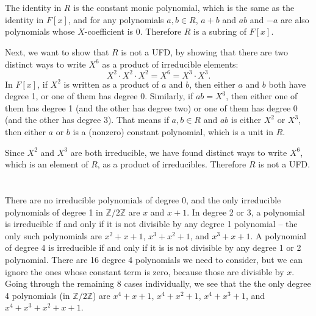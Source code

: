 \documentclass[12pt]{article}
\begin{document}
\section{}
\noindent{}\bigskip\par
The identity in $R$ is the constant monic polynomial, which is the same as the identity in $F[x]$, and for any polynomials $a,b \in R$, $a+b$ and $ab$ and $-a$ are also polynomials whose $X$-coefficient is 0. Therefore $R$ is a subring of $F[x]$.
\par
Next, we want to show that $R$ is not a UFD, by showing that there are two distinct ways to write $X^6$ as a product of irreducible elements:
\[ X^2 \cdot X^2 \cdot X^2 = X^6 = X^3 \cdot X^3. \]
In $F[x]$, if $X^2$ is written as a product of $a$ and $b$, then either $a$ and $b$ both have degree 1, or one of them has degree 0. Similarly, if $ab=X^3$, then either one of them has degree 1 (and the other has degree two) or one of them has degree 0 (and the other has degree 3). That means if $a,b \in R$ and $ab$ is either $X^2$ or $X^3$, then either $a$ or $b$ is a (nonzero) constant polynomial, which is a unit in $R$.
\par
Since $X^2$ and $X^3$ are both irreducible, we have found distinct ways to write $X^6$, which is an element of $R$, as a product of irreducibles. Therefore $R$ is not a UFD.

\section{}
\noindent{}\bigskip\par
There are no irreducible polynomials of degree 0, and the only irreducible polynomials of degree 1 in $\mathbb{Z}/2\mathbb{Z}$ are $x$ and $x+1$. In degree 2 or 3, a polynomial is irreducible if and only if it is not divisible by any degree 1 polynomial -- the only such polynomials are $x^2+x+1$, $x^3+x^2+1$, and $x^3+x+1$. A polynomial of degree 4 is irreducible if and only if it is is not divisible by any degree 1 or 2 polynomial. There are 16 degree 4 polynomials we need to consider, but we can ignore the ones whose constant term is zero, because those are divisible by $x$. Going through the remaining 8 cases individually, we see that the the only degree 4 polynomials (in $\mathbb{Z}/2\mathbb{Z}$) are $x^4+x+1$, $x^4+x^2+1$, $x^4+x^3+1$, and $x^4+x^3+x^2+x+1$.
\end{document}
